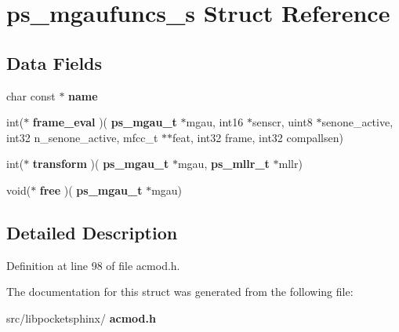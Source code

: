 \section{ps\+\_\+mgaufuncs\+\_\+s Struct Reference}
\label{structps__mgaufuncs__s}
\subsection*{Data Fields}
\begin{DoxyCompactItemize}
\item 
\mbox{\label{structps__mgaufuncs__s_a5f3570efd5d8a41003b9628663e66b4c}} 
char const  $\ast$ {\bfseries name}
\item 
\mbox{\label{structps__mgaufuncs__s_a3176f3e6fb82c673ef54f63b76a3fca9}} 
int($\ast$ {\bfseries frame\+\_\+eval} )(\textbf{ ps\+\_\+mgau\+\_\+t} $\ast$mgau, int16 $\ast$senscr, uint8 $\ast$senone\+\_\+active, int32 n\+\_\+senone\+\_\+active, mfcc\+\_\+t $\ast$$\ast$feat, int32 frame, int32 compallsen)
\item 
\mbox{\label{structps__mgaufuncs__s_a02df073c4e7dc562b5dcd3ac2bb07eb8}} 
int($\ast$ {\bfseries transform} )(\textbf{ ps\+\_\+mgau\+\_\+t} $\ast$mgau, \textbf{ ps\+\_\+mllr\+\_\+t} $\ast$mllr)
\item 
\mbox{\label{structps__mgaufuncs__s_a38dad1a9d594cf9a239de75f6c2e8d98}} 
void($\ast$ {\bfseries free} )(\textbf{ ps\+\_\+mgau\+\_\+t} $\ast$mgau)
\end{DoxyCompactItemize}


\subsection{Detailed Description}


Definition at line 98 of file acmod.\+h.



The documentation for this struct was generated from the following file\+:\begin{DoxyCompactItemize}
\item 
src/libpocketsphinx/\textbf{ acmod.\+h}\end{DoxyCompactItemize}
